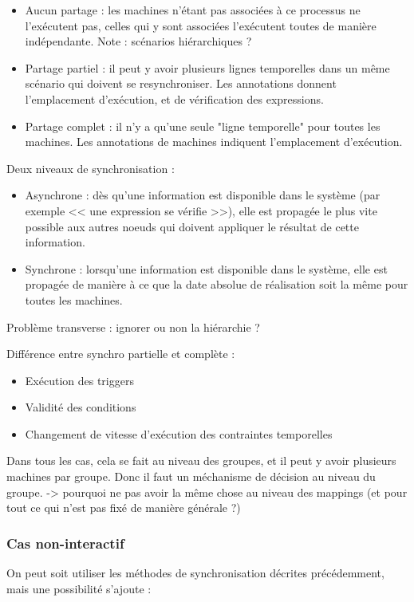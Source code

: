 \documentclass{article}
\begin{document}
\begin{itemize}
    \item Aucun partage : les machines n'étant pas associées à ce processus ne l'exécutent pas, celles qui y sont associées l'exécutent toutes de manière indépendante. Note : scénarios hiérarchiques ? 
    \item Partage partiel : il peut y avoir plusieurs lignes temporelles dans un même scénario qui doivent se resynchroniser. Les annotations donnent l'emplacement d'exécution, et de vérification des expressions.
    \item Partage complet : il n'y a qu'une seule "ligne temporelle" pour toutes les machines. Les annotations de machines indiquent l'emplacement d'exécution.
\end{itemize}

Deux niveaux de synchronisation : 
\begin{itemize}
    \item Asynchrone : dès qu'une information est disponible dans le système (par exemple << une expression se vérifie >>), elle est propagée le plus vite possible aux autres noeuds qui doivent appliquer le résultat de cette information.
    \item Synchrone : lorsqu'une information est disponible dans le système, elle est propagée de manière à ce que la date absolue de réalisation soit la même pour toutes les machines.
\end{itemize}

Problème transverse : ignorer ou non la hiérarchie ? 

Différence entre synchro partielle et complète : 
\begin{itemize}
    \item Exécution des triggers
    \item Validité des conditions
    \item Changement de vitesse d'exécution des contraintes temporelles
\end{itemize}

Dans tous les cas, cela se fait au niveau des groupes, et il peut y avoir plusieurs machines par groupe.
Donc il faut un méchanisme de décision au niveau du groupe.
-> pourquoi ne pas avoir la même chose au niveau des mappings (et pour tout ce qui n'est pas fixé de manière générale ?)

\subsubsection{Cas non-interactif}
On peut soit utiliser les méthodes de synchronisation décrites précédemment, mais une possibilité s'ajoute : 
\end{document}
